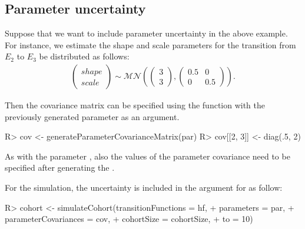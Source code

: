 \subsection{Parameter uncertainty}\label{subsec:unc}
Suppose that we want to include parameter uncertainty in the above example. For instance, we estimate the shape and scale parameters for the transition from $E_2$ to $E_3$ be distributed as follows:
\begin{align} \label{eqn:unc}
  \begin{pmatrix}
    shape \\ scale 
  \end{pmatrix}
  \sim
  \mathcal{MN}\left( 
    \begin{pmatrix}
      3 \\ 3 
    \end{pmatrix}
    ,
    \begin{pmatrix}
      0.5 & 0 \\ 0 & 0.5
    \end{pmatrix}
  \right) .
\end{align}

Then the covariance matrix can be specified using the  function with the previously generated parameter  as an argument.
\begin{Schunk}
\begin{Sinput}
R>   cov <- generateParameterCovarianceMatrix(par)
R>   cov[[2, 3]] <- diag(.5, 2)
\end{Sinput}
\end{Schunk}
As with the parameter , also the values of the parameter covariance  need to be specified after generating the . 

For the simulation, the uncertainty is included in the  argument for  as follow:
\begin{Schunk}
\begin{Sinput}
R>   cohort <- simulateCohort(transitionFunctions = hf, 
+                            parameters = par, 
+                            parameterCovariances = cov,
+                            cohortSize = cohortSize, 
+                            to = 10)
\end{Sinput}
\end{Schunk}


